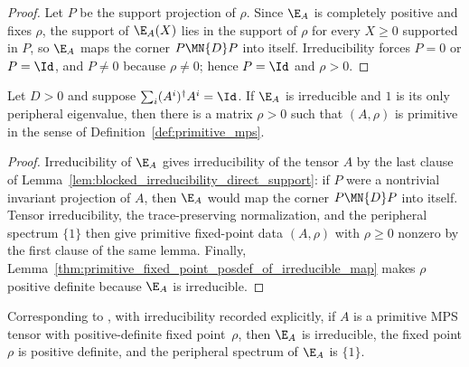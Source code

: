 \begin{proof}
    \leanok
    Let $P$ be the support projection of $\rho$.  Since $\E_A$ is completely
    positive and fixes $\rho$, the support of $\E_A(X)$ lies in the support
    of $\rho$ for every $X\ge0$ supported in $P$, so $\E_A$ maps the corner
    $P\MN{D}P$ into itself.  Irreducibility forces $P=0$ or $P=\Id$, and
    $P\neq0$ because $\rho\neq0$; hence $P=\Id$ and $\rho>0$.
\end{proof}

\begin{lemma}%
    \label{thm:primitive_from_strongly_irred}
    \leanok
    Let $D>0$ and suppose $\sum_i(A^i)^\dagger A^i=\Id$.  If $\E_A$ is
    irreducible and $1$ is its only peripheral eigenvalue, then there is a
    matrix $\rho>0$ such that $(A,\rho)$ is primitive in the sense of
    Definition~\ref{def:primitive_mps}.
\end{lemma}

\begin{proof}
    \leanok
    Irreducibility of $\E_A$ gives irreducibility of the tensor $A$ by the
    last clause of Lemma~\ref{lem:blocked_irreducibility_direct_support}: if
    $P$ were a nontrivial invariant projection of $A$, then $\E_A$ would map
    the corner $P\MN{D}P$ into itself.  Tensor irreducibility, the
    trace-preserving normalization, and the peripheral spectrum $\{1\}$ then
    give primitive fixed-point data $(A,\rho)$ with $\rho\ge0$ nonzero by the
    first clause of the same lemma.  Finally,
    Lemma~\ref{thm:primitive_fixed_point_posdef_of_irreducible_map} makes
    $\rho$ positive definite because $\E_A$ is irreducible.
\end{proof}

\begin{lemma}%
    \label{lem:strongly_irred_from_primitive}
    \leanok
    Corresponding to \cite[Proposition~3(c)]{Sanz2010Quantum}, with
    irreducibility recorded explicitly, if $A$ is a primitive MPS
    tensor with positive-definite fixed point~$\rho$, then $\E_A$ is
    irreducible, the fixed point $\rho$ is positive definite, and the
    peripheral spectrum of $\E_A$ is $\{1\}$.
\end{lemma}

